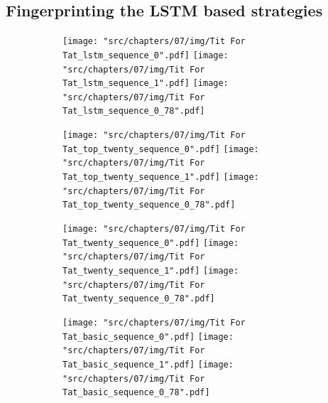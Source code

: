 \subsection{Fingerprinting the LSTM based strategies}

\newpage

\begin{figure}[!htbp]
    \begin{subfigure}{\textwidth}
        \texttt{[image: "src/chapters/07/img/Tit For Tat\_lstm\_sequence\_0".pdf]}
        \texttt{[image: "src/chapters/07/img/Tit For Tat\_lstm\_sequence\_1".pdf]}
        \texttt{[image: "src/chapters/07/img/Tit For Tat\_lstm\_sequence\_0\_78".pdf]}
    \end{subfigure}
    \begin{subfigure}{\textwidth}
        \texttt{[image: "src/chapters/07/img/Tit For Tat\_top\_twenty\_sequence\_0".pdf]}
        \texttt{[image: "src/chapters/07/img/Tit For Tat\_top\_twenty\_sequence\_1".pdf]}
        \texttt{[image: "src/chapters/07/img/Tit For Tat\_top\_twenty\_sequence\_0\_78".pdf]}
    \end{subfigure}
    \begin{subfigure}{\textwidth}
        \texttt{[image: "src/chapters/07/img/Tit For Tat\_twenty\_sequence\_0".pdf]}
        \texttt{[image: "src/chapters/07/img/Tit For Tat\_twenty\_sequence\_1".pdf]}
        \texttt{[image: "src/chapters/07/img/Tit For Tat\_twenty\_sequence\_0\_78".pdf]}
    \end{subfigure}
    \begin{subfigure}{\textwidth}
        \texttt{[image: "src/chapters/07/img/Tit For Tat\_basic\_sequence\_0".pdf]}
        \texttt{[image: "src/chapters/07/img/Tit For Tat\_basic\_sequence\_1".pdf]}
        \texttt{[image: "src/chapters/07/img/Tit For Tat\_basic\_sequence\_0\_78".pdf]}
    \end{subfigure}
\end{figure}

